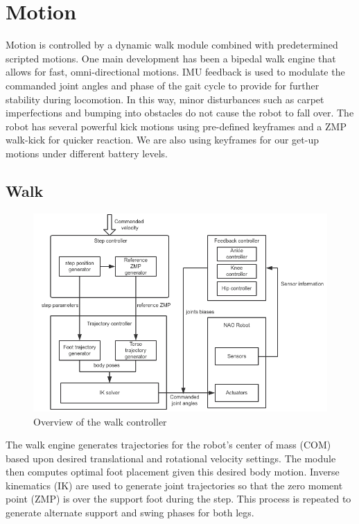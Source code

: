 \documentclass{article}
\begin{document}
\section{Motion}
	Motion is controlled by a dynamic walk module combined with predetermined scripted motions. One main development has been a bipedal walk engine that allows for fast, omni-directional motions. IMU feedback is used to modulate the commanded joint angles and phase of the gait cycle to provide for further stability during locomotion. In this way, minor disturbances such as carpet imperfections and bumping into obstacles do not cause the robot to fall over. The robot has several powerful kick motions using pre-defined keyframes and a ZMP walk-kick for quicker reaction. We are also using keyframes for our get-up motions under different battery levels.

\subsection{Walk}

	\begin{figure}[H]
		\centering
		\includegraphics[width=1\textwidth]{figures/WalkOverView.png}
		\caption{Overview of the walk controller}
	\end{figure}

	The walk engine generates trajectories for the robot's center of mass (COM) based upon desired translational and rotational velocity settings. The module then computes optimal foot placement given this desired body motion. Inverse kinematics (IK) are used to generate joint trajectories so that the zero moment point (ZMP) is over the support foot during the step. This process is repeated to generate alternate support and swing phases for both legs.
\end{document}
